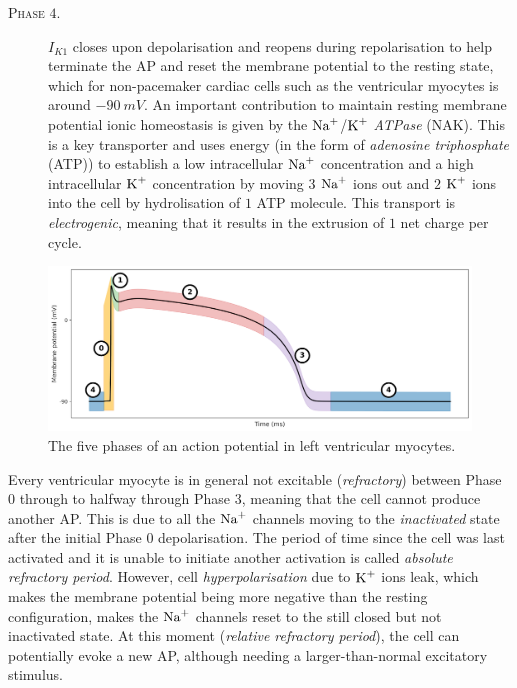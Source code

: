\begin{description}
	\item[\textsc{Phase $4$.}] $I_{K1}$ closes upon depolarisation and reopens during repolarisation to help terminate the AP and reset the membrane potential to the resting state, which for non-pacemaker cardiac cells such as the ventricular myocytes is around $\SI{-90}{mV}$. An important contribution to maintain resting membrane potential ionic homeostasis is given by the $\textrm{Na}^{+}$/$\textrm{K}^{+}$ \textit{ATPase} (\acs{NAK}). This is a key transporter and uses energy (in the form of \textit{adenosine triphosphate} (\acs{ATP})) to establish a low intracellular $\textrm{Na}^{+}$ concentration and a high intracellular $\textrm{K}^{+}$ concentration by moving $3$ $\textrm{Na}^{+}$ ions out and $2$ $\textrm{K}^{+}$ ions into the cell by hydrolisation of $1$ ATP molecule. This transport is \textit{electrogenic}, meaning that it results in the extrusion of $1$ net charge per cycle.
\end{description}

\begin{figure}[!ht]
    \myfloatalign
    \includegraphics[width=\textwidth]{figures/chapter01/AP_phases.pdf}
    \caption{The five phases of an action potential in left ventricular myocytes.}
    \label{fig:my_label}
\end{figure}

\vspace{0.2cm}
Every ventricular myocyte is in general not excitable (\textit{refractory}) between Phase $0$ through to halfway through Phase $3$, meaning that the cell cannot produce another AP. This is due to all the $\textrm{Na}^{+}$ channels moving to the \textit{inactivated} state after the initial Phase $0$ depolarisation. The period of time since the cell was last activated and it is unable to initiate another activation is called \textit{absolute refractory period}. However, cell \textit{hyperpolarisation} due to $\textrm{K}^{+}$ ions leak, which makes the membrane potential being more negative than the resting configuration, makes the $\textrm{Na}^{+}$ channels reset to the still closed but not inactivated state. At this moment (\textit{relative refractory period}), the cell can potentially evoke a new AP, although needing a larger-than-normal excitatory stimulus.


